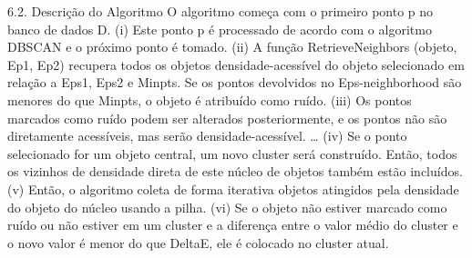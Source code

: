 6.2. Descrição do Algoritmo
O algoritmo começa com o primeiro ponto p no banco de dados D.
(i) Este ponto p é processado de acordo com o algoritmo DBSCAN e o próximo ponto é tomado.
(ii) A função RetrieveNeighbors (objeto, Ep1, Ep2) recupera todos os objetos densidade-acessível do objeto selecionado em relação a Eps1, Eps2 e Minpts. Se os pontos devolvidos no Eps-neighborhood são menores do que Minpts, o objeto é atribuído como ruído.
(iii) Os pontos marcados como ruído podem ser alterados posteriormente, e os pontos não são diretamente acessíveis, mas serão densidade-acessível.
…
(iv) Se o ponto selecionado for um objeto central, um novo cluster será construído. Então, todos os vizinhos de densidade direta de este núcleo de objetos também estão incluídos.
(v) Então, o algoritmo coleta de forma iterativa objetos atingidos pela densidade do objeto do núcleo usando a pilha.
(vi) Se o objeto não estiver marcado como ruído ou não estiver em um cluster e a diferença
entre o valor médio do cluster e o novo valor é menor do que DeltaE, ele é colocado no cluster atual.